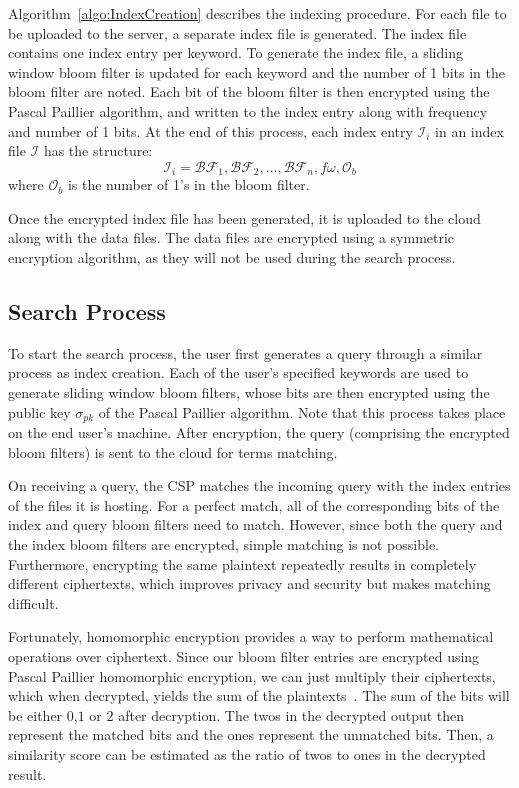 Algorithm~\ref{algo:IndexCreation} describes the indexing procedure.
For each file to be uploaded to the server, a separate index file is generated. The index
file contains one index entry per keyword. To generate the index file, a sliding window bloom
filter is updated for each keyword and the number of 1 bits in the bloom filter are noted.
Each bit of the bloom filter is then encrypted using the Pascal Paillier algorithm, and written to 
the index entry along with frequency and number of 1 bits.
At the end of this process, each index entry $\mathcal{I}_i$ in an index file $\mathcal{I}$ has
the structure: 
\begin{equation}
\mathcal{I}_i = \mathcal{BF}_1,\mathcal{BF}_2, \ldots ,\mathcal{BF}_n, f\omega,
\mathcal{O}_b
  \label{eq: indexEntry}
\end{equation} 
where $\mathcal{O}_b$ is the number of 1's in the bloom filter.

Once the encrypted index file has been generated, it is uploaded to the cloud along with the data files.
The data files are encrypted using a symmetric encryption algorithm, as they will not be used during the
search process.

\subsection{Search Process}

To start the search process, the user first generates a query through a similar process as index creation. 
Each of the user's specified keywords are used to generate sliding window bloom filters, whose bits are then
encrypted using the public key $\sigma_{pk}$ of the Pascal Paillier algorithm. 
Note that this process takes place on the end user's machine. After encryption, 
the query (comprising the encrypted bloom filters) is sent to the cloud for terms matching.

On receiving a query, the CSP matches the incoming query with the index entries of 
the files it is hosting. For a perfect match, all of the corresponding bits of the index 
and query bloom filters need to match. However, since both the query and the index
bloom filters are encrypted, simple matching is not possible. Furthermore, encrypting the
same plaintext repeatedly results in completely different ciphertexts, which improves
privacy and security but makes matching difficult.

Fortunately, homomorphic encryption provides a way to perform mathematical operations 
over ciphertext. Since our bloom filter entries are encrypted using Pascal Paillier homomorphic
encryption, we can just multiply their ciphertexts, which when decrypted, yields the sum of
the plaintexts~\cite{pascal}. The sum of the bits will be either $0$,$1$ or $2$ after decryption.
The twos in the decrypted output then represent the matched
bits and the ones represent the unmatched bits. Then, a similarity score
can be estimated as the ratio of twos to ones in the decrypted result.

